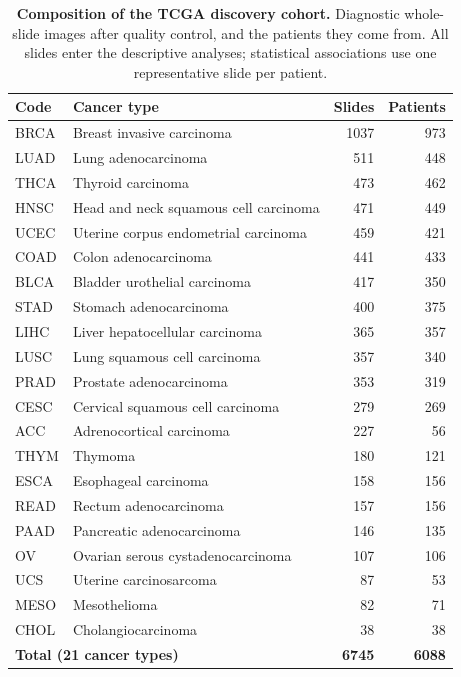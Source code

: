 \documentclass[11pt]{article}
\begin{document}
\begin{table}[htbp]
\centering
\caption{\textbf{Composition of the TCGA discovery cohort.} Diagnostic whole-slide
images after quality control, and the patients they come from. All slides enter
the descriptive analyses; statistical associations use one representative slide
per patient.}
\label{tab:s1}
\small
\begin{tabular}{llrr}
\toprule
Code & Cancer type & Slides & Patients \\
\midrule
BRCA & Breast invasive carcinoma & \num{1037} & \num{973} \\
LUAD & Lung adenocarcinoma & \num{511} & \num{448} \\
THCA & Thyroid carcinoma & \num{473} & \num{462} \\
HNSC & Head and neck squamous cell carcinoma & \num{471} & \num{449} \\
UCEC & Uterine corpus endometrial carcinoma & \num{459} & \num{421} \\
COAD & Colon adenocarcinoma & \num{441} & \num{433} \\
BLCA & Bladder urothelial carcinoma & \num{417} & \num{350} \\
STAD & Stomach adenocarcinoma & \num{400} & \num{375} \\
LIHC & Liver hepatocellular carcinoma & \num{365} & \num{357} \\
LUSC & Lung squamous cell carcinoma & \num{357} & \num{340} \\
PRAD & Prostate adenocarcinoma & \num{353} & \num{319} \\
CESC & Cervical squamous cell carcinoma & \num{279} & \num{269} \\
ACC & Adrenocortical carcinoma & \num{227} & \num{56} \\
THYM & Thymoma & \num{180} & \num{121} \\
ESCA & Esophageal carcinoma & \num{158} & \num{156} \\
READ & Rectum adenocarcinoma & \num{157} & \num{156} \\
PAAD & Pancreatic adenocarcinoma & \num{146} & \num{135} \\
OV & Ovarian serous cystadenocarcinoma & \num{107} & \num{106} \\
UCS & Uterine carcinosarcoma & \num{87} & \num{53} \\
MESO & Mesothelioma & \num{82} & \num{71} \\
CHOL & Cholangiocarcinoma & \num{38} & \num{38} \\
\midrule
\multicolumn{2}{l}{\textbf{Total (21 cancer types)}} & \textbf{\num{6745}} & \textbf{\num{6088}} \\
\bottomrule
\end{tabular}
\end{table}
\end{document}
